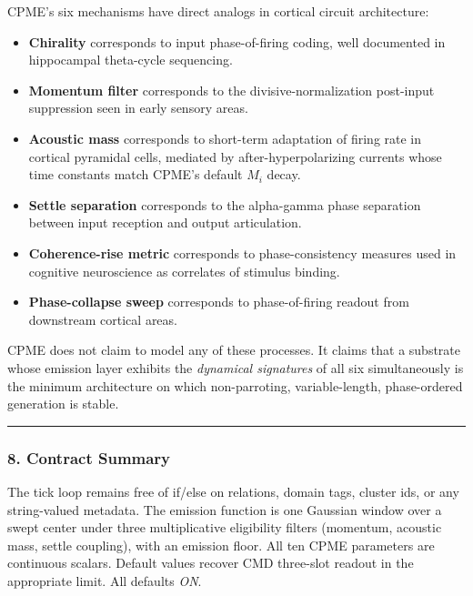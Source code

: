 \documentclass[
  11pt,
  a4paper,
]{article}
\providecommand{\tightlist}{%
  \setlength{\itemsep}{0pt}\setlength{\parskip}{0pt}}
\begin{document}
CPME's six mechanisms have direct analogs in cortical circuit
architecture:

\begin{itemize}
\tightlist
\item
  \textbf{Chirality} corresponds to input phase-of-firing coding, well
  documented in hippocampal theta-cycle sequencing.
\item
  \textbf{Momentum filter} corresponds to the divisive-normalization
  post-input suppression seen in early sensory areas.
\item
  \textbf{Acoustic mass} corresponds to short-term adaptation of firing
  rate in cortical pyramidal cells, mediated by after-hyperpolarizing
  currents whose time constants match CPME's default \(M_i\) decay.
\item
  \textbf{Settle separation} corresponds to the alpha-gamma phase
  separation between input reception and output articulation.
\item
  \textbf{Coherence-rise metric} corresponds to phase-consistency
  measures used in cognitive neuroscience as correlates of stimulus
  binding.
\item
  \textbf{Phase-collapse sweep} corresponds to phase-of-firing readout
  from downstream cortical areas.
\end{itemize}

CPME does not claim to model any of these processes. It claims that a
substrate whose emission layer exhibits the \emph{dynamical signatures}
of all six simultaneously is the minimum architecture on which
non-parroting, variable-length, phase-ordered generation is stable.

\begin{center}\rule{0.5\linewidth}{0.5pt}\end{center}

\subsubsection{8. Contract Summary}\label{contract-summary}

The tick loop remains free of if/else on relations, domain tags, cluster
ids, or any string-valued metadata. The emission function is one
Gaussian window over a swept center under three multiplicative
eligibility filters (momentum, acoustic mass, settle coupling), with an
emission floor. All ten CPME parameters are continuous scalars. Default
values recover CMD three-slot readout in the appropriate limit. All
defaults \emph{ON}.
\end{document}
